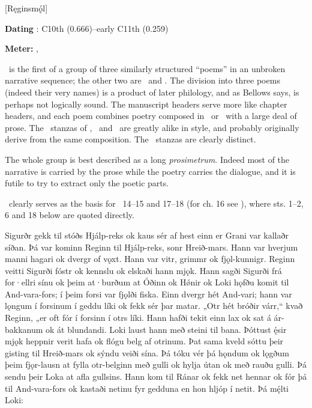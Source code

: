 [Ręginsmǫ́l]

\begin{flushright}%
\textbf{Dating} \parencite{Sapp2022}: C10th (0.666)–early C11th (0.259)

\textbf{Meter:} \Ljodahattr, \Fornyrdislag%
\end{flushright}

\Reginsmal\ is the first of a group of three similarly structured “poems” in an unbroken narrative sequence; the other two are \Fafnismal\ and \Sigrdrifumal.  The division into three poems (indeed their very names) is a product of later philology, and as Bellows says, is perhaps not logically sound.  The manuscript headers serve more like chapter headers, and each poem combines poetry composed in \Ljodahattr\ or \Fornyrdislag\ with a large deal of prose.  The \Ljodahattr\ stanzas of \Reginsmal, \Fafnismal\ and \Sigrdrifumal\ are greatly alike in style, and probably originally derive from the same composition.  The \Fornyrdislag\ stanzas are clearly distinct.

The whole group is best described as a long \emph{prosimetrum}.  Indeed most of the narrative is carried by the prose while the poetry carries the dialogue, and it is futile to try to extract only the poetic parts.

\Reginsmal\ clearly serves as the basis for \VolsungaSaga\ 14–15 and 17–18 (for ch. 16 see \Gripisspa), where sts. 1–2, 6 and 18 below are quoted directly.

\sectionline

\bpg\bpa Sigurðr gekk til stóðs Hjálp-reks ok kaus sér af hest einn er Grani var kallaðr síðan. Þá var kominn Reginn til Hjálp-reks, sonr Hreið-mars. Hann var hverjum manni hagari ok dvergr of vǫxt. Hann var vitr, grimmr ok fjǫl-kunnigr. Reginn veitti Sigurði fóstr ok kennslu ok elskaði hann mjǫk. Hann sagði Sigurði frá for·ellri sínu ok þeim at·burðum at Óðinn ok Hǿnir ok Loki hǫfðu komit til And-vara-fors; í þeim forsi var fjǫlði fiska. Einn dvergr hét And-vari; hann var lǫngum í forsinum í geddu líki ok fekk sér þar matar. „Otr hét bróðir várr,“ kvað Reginn, „er oft fór í forsinn í otrs líki. Hann hafði tekit einn lax ok sat á ár-bakkanum ok át blundandi. Loki laust hann með steini til bana. Þóttust ę́sir mjǫk heppnir verit hafa ok flógu belg af otrinum. Þat sama kveld sóttu þeir gisting til Hreið-mars ok sýndu veiði sína. Þá tóku vér þá hǫndum ok lǫgðum þeim fjǫr-lausn at fylla otr-belginn með gulli ok hylja útan ok með rauðu gulli. Þá sendu þeir Loka at afla gullsins. Hann kom til Ránar ok fekk net hennar ok fór þá til And-vara-fors ok kastaði netinu fyr gedduna en hon hljóp í netit. Þá mę́lti Loki:\epa

